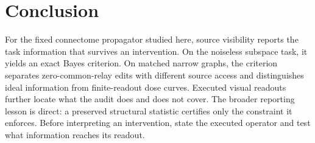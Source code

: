 \section{Conclusion}
\label{sec:conclusion}

For the fixed connectome propagator studied here, source visibility reports
the task information that survives an intervention. On the noiseless subspace
task, it yields an exact Bayes criterion. On matched narrow graphs, the
criterion separates zero-common-relay edits with different source access and
distinguishes ideal information from finite-readout dose curves. Executed
visual readouts further locate what the audit does and does not cover. The
broader reporting lesson is direct: a
preserved structural statistic certifies only the constraint it enforces.
Before interpreting an intervention, state the executed operator and test
what information reaches its readout.
